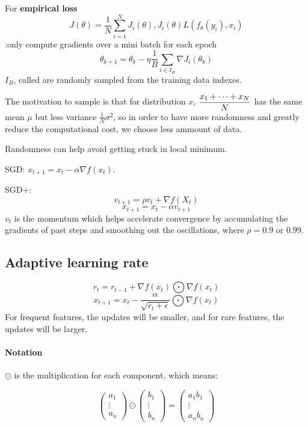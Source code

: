For \textbf{empirical loss} 
\[J(\theta)=\frac{1}{N}\sum_{i=1}^N J_i(\theta),J_i(\theta)L(f_\theta(y_i),x_i)\]
:only compute gradients over a mini batch for each epoch
\[\theta_{k+1}=\theta_k-\eta\frac{1}{B}\sum_{i\in I_B} \nabla  J_i(\theta_k)\]
$ I_B $, called  are randomly sampled from the training data indexes.

The motivation to sample is that for distribution  $ x $,  $ \displaystyle\frac{x_1+\cdots+x_N}{N} $ has the same mean  $ \mu  $ but less variance  $ \frac{1}{N}\sigma^2 $, so in order to have more randomness and greatly reduce the computational cost, we choose less ammount of data.

Randomness can help avoid getting stuck in  local minimum.

SGD: $ x_{t+1}=x_t-\alpha \nabla f(x_t) $.

SGD+:
\[v_{t+1}=\rho v_t+\nabla f(X_t)\]
\[x_{t+1}=x_t-\alpha v_{t+1}\]
$ v_t $ is the momentum which helps accelerate convergence by accumulating the gradients of past steps and smoothing out the oscillations, where  $ \rho=0.9  $ or  $ 0.99 $.  

\subsection{Adaptive learning rate}

\[r_t=r_{t-1}+\nabla f(x_t)\bigodot  \nabla f(x_t)\]
\[x_{t+1}=x_t-\frac{\alpha}{\sqrt{r_t+\epsilon}}\bigodot  \nabla f(x_t)\]
For frequent features, the  updates will be smaller, and for rare features, the updates will be larger.

\paragraph{Notation}  $ \odot $ is  the multiplication for each component, which means:


\[\begin{pmatrix}
    a_1\\
    \vdots\\
    a_n
\end{pmatrix}\odot\begin{pmatrix}
    b_1\\
    \vdots\\
    b_n
\end{pmatrix}=\begin{pmatrix}
    a_1b_1\\
    \vdots\\
    a_nb_n
\end{pmatrix}\]


